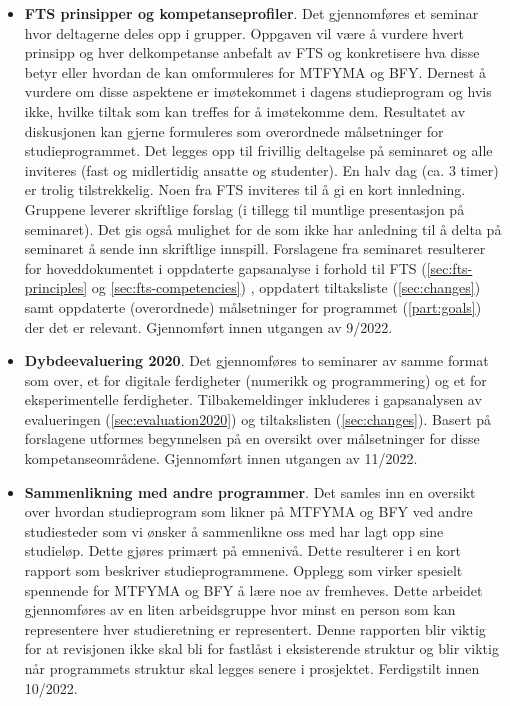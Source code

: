 \begin{itemize}
	\item \textbf{FTS prinsipper og kompetanseprofiler}. Det gjennomføres et seminar hvor deltagerne deles opp i grupper. Oppgaven vil være å vurdere hvert prinsipp og hver delkompetanse anbefalt av FTS og konkretisere hva disse betyr eller hvordan de kan omformuleres for MTFYMA og BFY. Dernest å vurdere om disse aspektene er imøtekommet i dagens studieprogram og hvis ikke, hvilke tiltak som kan treffes for å imøtekomme dem. Resultatet av diskusjonen kan gjerne formuleres som overordnede målsetninger for studieprogrammet. Det legges opp til frivillig deltagelse på seminaret og alle inviteres (fast og midlertidig ansatte og studenter). En halv dag (ca. 3 timer) er trolig tilstrekkelig. Noen fra FTS inviteres til å gi en kort innledning. Gruppene leverer skriftlige forslag (i tillegg til muntlige presentasjon på seminaret). Det gis også mulighet for de som ikke har anledning til å delta på seminaret å sende inn skriftlige innspill. Forslagene fra seminaret resulterer for hoveddokumentet i oppdaterte gapsanalyse i forhold til FTS (\ref{sec:fts-principles} og \ref{sec:fts-competencies}) , oppdatert tiltaksliste (\ref{sec:changes}) samt oppdaterte (overordnede) målsetninger for programmet (\ref{part:goals}) der det er relevant. Gjennomført innen utgangen av 9/2022.
	\item \textbf{Dybdeevaluering 2020}. Det gjennomføres to seminarer av samme format som over, et for digitale ferdigheter (numerikk og programmering) og et for eksperimentelle ferdigheter. Tilbakemeldinger inkluderes i gapsanalysen av evalueringen (\ref{sec:evaluation2020}) og tiltakslisten (\ref{sec:changes}). Basert på forslagene utformes begynnelsen på en oversikt over målsetninger for disse kompetanseområdene. Gjennomført innen utgangen av 11/2022.
	\item \textbf{Sammenlikning med andre programmer}. Det samles inn en oversikt over hvordan studieprogram som likner på MTFYMA og BFY ved andre studiesteder som vi ønsker å sammenlikne oss med har lagt opp sine studieløp. Dette gjøres primært på emnenivå. Dette resulterer i en kort rapport som beskriver studieprogrammene. Opplegg som virker spesielt spennende for MTFYMA og BFY å lære noe av fremheves. Dette arbeidet gjennomføres av en liten arbeidsgruppe hvor minst en person som kan representere hver studieretning er representert. Denne rapporten blir viktig for at revisjonen ikke skal bli for fastlåst i eksisterende struktur og blir viktig når programmets struktur skal legges senere i prosjektet. Ferdigstilt innen 10/2022.

\end{itemize}
